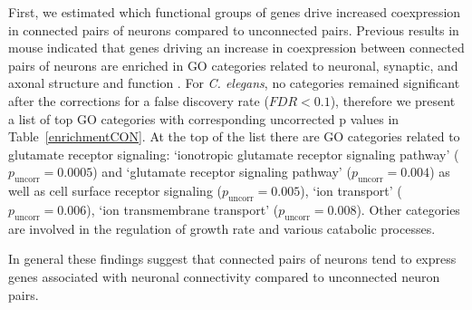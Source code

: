 \documentclass[10pt,letterpaper]{article}
\begin{document}
First, we estimated which functional groups of genes drive increased coexpression in connected pairs of neurons compared to unconnected pairs.
Previous results in mouse indicated that genes driving an increase in coexpression between connected pairs of neurons are enriched in GO categories related to neuronal, synaptic, and axonal structure and function
\cite{Fulcher:2016ck, Ji:2014jw, Fakhry:2015kl, French:2011cz}.
For \emph{C. elegans}, no categories remained significant after the corrections for a false discovery rate ($FDR < 0.1$), therefore we present a list of top GO categories with corresponding uncorrected p values in Table~\ref{enrichmentCON}.
At the top of the list there are GO categories related to glutamate receptor signaling: `ionotropic glutamate receptor signaling pathway' ($p_\mathrm{uncorr} = 0.0005$) and `glutamate receptor signaling pathway' ($p_\mathrm{uncorr} = 0.004$) as well as 
cell surface receptor signaling ($p_\mathrm{uncorr} = 0.005$), `ion transport' ($p_\mathrm{uncorr} = 0.006$), `ion transmembrane transport' ($p_\mathrm{uncorr} = 0.008$). 
Other categories are involved in the regulation of growth rate and various catabolic processes. 

In general these findings suggest that connected pairs of neurons tend to express genes associated with neuronal connectivity compared to unconnected neuron pairs.\\
\end{document}
